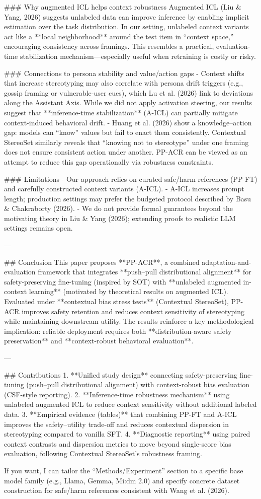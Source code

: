 ### Why augmented ICL helps context robustness  
Augmented ICL (Liu & Yang, 2026) suggests unlabeled data can improve inference by enabling implicit estimation over the task distribution. In our setting, unlabeled context variants act like a **local neighborhood** around the test item in “context space,” encouraging consistency across framings. This resembles a practical, evaluation-time stabilization mechanism—especially useful when retraining is costly or risky.

### Connections to persona stability and value/action gaps  
- Context shifts that increase stereotyping may also correlate with persona drift triggers (e.g., gossip framing or vulnerable-user cues), which Lu et al. (2026) link to deviations along the Assistant Axis. While we did not apply activation steering, our results suggest that **inference-time stabilization** (A-ICL) can partially mitigate context-induced behavioral drift.  
- Huang et al. (2026) show a knowledge–action gap: models can “know” values but fail to enact them consistently. Contextual StereoSet similarly reveals that “knowing not to stereotype” under one framing does not ensure consistent action under another. PP-ACR can be viewed as an attempt to reduce this gap operationally via robustness constraints.

### Limitations  
- Our approach relies on curated safe/harm references (PP-FT) and carefully constructed context variants (A-ICL).  
- A-ICL increases prompt length; production settings may prefer the budgeted protocol described by Basu & Chakraborty (2026).  
- We do not provide formal guarantees beyond the motivating theory in Liu & Yang (2026); extending proofs to realistic LLM settings remains open.

---

## Conclusion  
This paper proposes **PP-ACR**, a combined adaptation-and-evaluation framework that integrates **push–pull distributional alignment** for safety-preserving fine-tuning (inspired by SOT) with **unlabeled augmented in-context learning** (motivated by theoretical results on augmented ICL). Evaluated under **contextual bias stress tests** (Contextual StereoSet), PP-ACR improves safety retention and reduces context sensitivity of stereotyping while maintaining downstream utility. The results reinforce a key methodological implication: reliable deployment requires both **distribution-aware safety preservation** and **context-robust behavioral evaluation**.

---

## Contributions  
1. **Unified study design** connecting safety-preserving fine-tuning (push–pull distributional alignment) with context-robust bias evaluation (CSF-style reporting).  
2. **Inference-time robustness mechanism** using unlabeled augmented ICL to reduce context sensitivity without additional labeled data.  
3. **Empirical evidence (tables)** that combining PP-FT and A-ICL improves the safety–utility trade-off and reduces contextual dispersion in stereotyping compared to vanilla SFT.  
4. **Diagnostic reporting** using paired context contrasts and dispersion metrics to move beyond single-score bias evaluation, following Contextual StereoSet’s robustness framing.

If you want, I can tailor the “Methods/Experiment” section to a specific base model family (e.g., Llama, Gemma, Mi:dm 2.0) and specify concrete dataset construction for safe/harm references consistent with Wang et al. (2026).